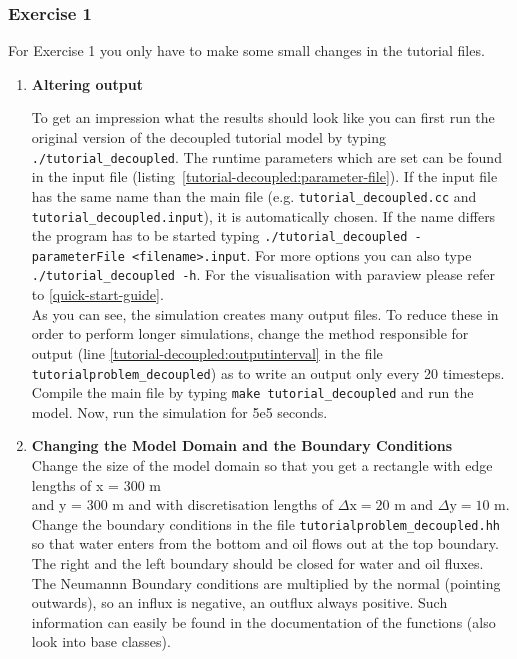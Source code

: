 \subsubsection{Exercise 1}
\renewcommand{\labelenumi}{\alph{enumi})}
For Exercise 1 you only have to make some small changes in the tutorial files.
\begin{enumerate}
\item \textbf{Altering output}

To get an impression what the results should look like you can first run the original version of the decoupled tutorial model by typing  \texttt{./tutorial\_decoupled}. The runtime parameters which are set can be found in the input file (listing~\ref{tutorial-decoupled:parameter-file}). If the input file has the same name than the main file (e.g. \texttt{tutorial\_decoupled.cc} and \texttt{tutorial\_decoupled.input}), it is automatically chosen. If the name differs the program has to be started typing \texttt{./tutorial\_decoupled -parameterFile <filename>.input}. For more options you can also type \texttt{./tutorial\_decoupled -h}. For the visualisation with paraview please refer to \ref{quick-start-guide}.\\
As you can see, the simulation creates many output files. To reduce these in order to perform longer simulations, change the method responsible for output (line \ref{tutorial-decoupled:outputinterval} in the file \texttt{tutorialproblem\_decoupled}) as to write an output only every 20 timesteps. Compile the main file by typing \texttt{make tutorial\_decoupled} and run the model. Now, run the simulation for 5e5 seconds.

\item \textbf{Changing the Model Domain and the Boundary Conditions} \\
Change the size of the model domain so that you get a rectangle
with edge lengths of x = 300 m \\  and y = 300 m and with discretisation lengths of  $\Delta \text{x} = 20$ m and $\Delta \text{y} = 10$ m. \\
Change the boundary conditions in the file \texttt{tutorialproblem\_decoupled.hh} so that water enters from the bottom and oil flows out at the top boundary. The right and the left boundary should be closed for water and oil fluxes. The Neumannn Boundary conditions are multiplied by the normal (pointing outwards), so an influx is negative, an outflux always positive. Such information can easily be found in the documentation of the functions (also look into base classes).


\end{enumerate}
